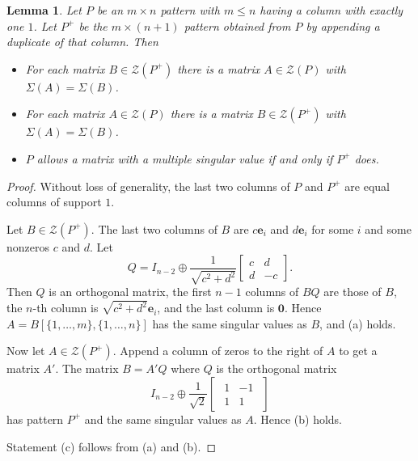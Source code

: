 \documentclass[preprint,12pt]{elsarticle}
\newtheorem{lemma}[theorem]{Lemma}
\begin{document}
\begin{lemma}
\label{columnaugment}
    Let $P$ be an $m\times n$ pattern with $m \leq n$ having a column with exactly one $1$. 
    Let $P^+$ be the $m\times (n+1)$ pattern obtained from $P$ by appending a duplicate of that column.
    Then 
    \begin{itemize}
    \item[\rm (a)]  For each matrix  $B \in \mathcal{Z}(P^+)$
     there is a matrix $A \in \mathcal{Z}(P)$ with   $\Sigma(A) = \Sigma(B)$. 
    \item[\rm (b)] For each matrix  $A \in \mathcal{Z}(P)$
     there is a matrix $B \in \mathcal{Z}(P^{+})$ with   $\Sigma(A) = \Sigma(B)$. 
    \item[\rm (c) ] $P$ allows a matrix with a multiple singular value if and only if $P^+$ does. 
     \end{itemize}
\end{lemma}
\begin{proof}
Without loss of generality, the last two columns of $P$ and $P^+$ 
are equal columns of support $1$.

Let $B \in \mathcal{Z}(P^{+})$. The last two columns of $B$ are 
$c \mathbf e_i$ and $d \mathbf e_i$ for some $i$ and some nonzeros $c$ and $d$.
Let 
\[ Q= I_{n-2} \oplus 
\frac{1}{\sqrt{c^2+d^2}}
\left[ \begin{array}{rr}
c& d\\ 
d &   -c
\end{array}
\right]. \]
Then $Q$ is an orthogonal matrix, the 
first $n-1$ columns of $BQ$ are those of $B$,
the $n$-th column  is $\sqrt{c^2+d^2}\mathbf e_i$, and the last column is $\mathbf 0$.
Hence $A=B[\{1,\ldots,m\},\{1,\ldots, n\}]$ has the same singular values as $B$, and (a) holds.

Now let $A \in \mathcal{Z}(P^{+})$. Append a column of zeros to the right of $A$ to get a matrix $A'$.
The matrix $B=A'Q$ where $Q$ is the orthogonal matrix
\[ 
I_{n-2} \oplus 
\frac{1}{\sqrt 2}\begin{bmatrix}
\begin{array}{rr}
    1 & -1 \\
    1 & 1
    \end{array}
\end{bmatrix}
\]
has pattern $P^+$ and the same singular values as $A$.  Hence (b) holds.

Statement (c) follows from (a) and (b). 
\end{proof}
\end{document}
